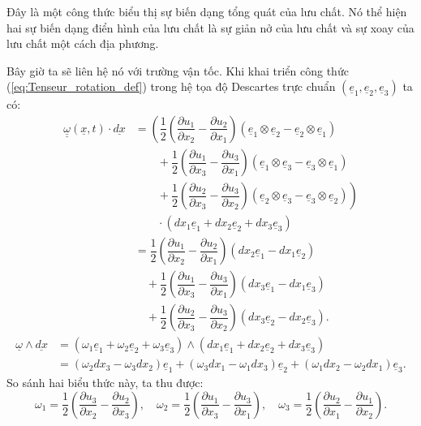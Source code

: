 \documentclass[../../../main.tex]{subfiles}
\begin{document}
	Đây là một công thức biểu thị sự biến dạng tổng quát của lưu chất. Nó thể hiện hai sự biến dạng điển hình của lưu chất là sự giản nở của lưu chất và sự xoay của lưu chất một cách địa phương.
	
	Bây giờ ta sẽ liên hệ nó với trường vận tốc. Khi khai triển công thức (\ref{eq:Tenseur_rotation_def}) trong hệ tọa độ Descartes trực chuẩn $(\underline{e}_1,\underline{e}_2,\underline{e}_3)$ ta có:
		\[
			\begin{aligned}
				\underline{\underline{\omega}}\left(\underline{x},t\right)\cdot\underline{dx}&=\left(\dfrac{1}{2}\left(\dfrac{\partial u_1}{\partial x_2}-\dfrac{\partial u_2}{\partial x_1}\right)\left(\underline{e}_1\otimes\underline{e}_2-\underline{e}_2\otimes\underline{e}_1\right)\right.\\
				&\qquad+\dfrac{1}{2}\left(\dfrac{\partial u_1}{\partial x_3}-\dfrac{\partial u_3}{\partial x_1}\right)\left(\underline{e}_1\otimes\underline{e}_3-\underline{e}_3\otimes\underline{e}_1\right)\\
				&\left.\qquad+\dfrac{1}{2}\left(\dfrac{\partial u_2}{\partial x_3}-\dfrac{\partial u_3}{\partial x_2}\right)\left(\underline{e}_2\otimes\underline{e}_3-\underline{e}_3\otimes\underline{e}_2\right)\right)\\
				&\qquad\cdot\left(dx_1\underline{e}_1+dx_2\underline{e}_2+dx_3\underline{e}_3\right)\\
				&=\dfrac{1}{2}\left(\dfrac{\partial u_1}{\partial x_2}-\dfrac{\partial u_2}{\partial x_1}\right)\left(dx_2\underline{e}_1-dx_1\underline{e}_2\right)\\
				&\quad+\dfrac{1}{2}\left(\dfrac{\partial u_1}{\partial x_3}-\dfrac{\partial u_3}{\partial x_1}\right)\left(dx_3\underline{e}_1-dx_1\underline{e}_3\right)\\
				&\quad+\dfrac{1}{2}\left(\dfrac{\partial u_2}{\partial x_3}-\dfrac{\partial u_3}{\partial x_2}\right)\left(dx_3\underline{e}_2-dx_2\underline{e}_3\right).
			\end{aligned}
		\]
		\[
			\begin{aligned}
				\underline{\omega}\wedge\underline{dx}&=\left(\omega_1\underline{e}_1+\omega_2\underline{e}_2+\omega_3\underline{e}_3\right)\wedge\left(dx_1\underline{e}_1+dx_2\underline{e}_2+dx_3\underline{e}_3\right)\\
				&=\left(\omega_2dx_3-\omega_3dx_2\right)\underline{e}_1+\left(\omega_3dx_1-\omega_1dx_3\right)\underline{e}_2+\left(\omega_1dx_2-\omega_2dx_1\right)\underline{e}_3.
			\end{aligned}
		\]
	So sánh hai biểu thức này, ta thu được:
		\[
			\omega_1=\dfrac{1}{2}\left(\dfrac{\partial u_3}{\partial x_2}-\dfrac{\partial u_2}{\partial x_3}\right),\quad\omega_2=\dfrac{1}{2}\left(\dfrac{\partial u_1}{\partial x_3}-\dfrac{\partial u_3}{\partial x_1}\right),\quad\omega_3=\dfrac{1}{2}\left(\dfrac{\partial u_2}{\partial x_1}-\dfrac{\partial u_1}{\partial x_2}\right).
		\]
\end{document}
